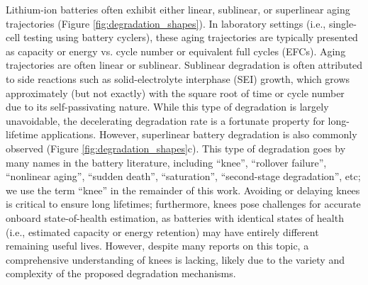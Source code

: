 \documentclass[journal=jpclcd,manuscript=article]{achemso}
\begin{document}
Lithium-ion batteries often exhibit either linear, sublinear, or superlinear aging trajectories (Figure \ref{fig:degradation_shapes}). In laboratory settings (i.e., single-cell testing using battery cyclers), these aging trajectories are typically presented as capacity or energy vs. cycle number or equivalent full cycles (EFCs). Aging trajectories are often linear\cite{ma_editors_2019, keil_electrochemical_2020, keil_electrochemical_2020,  preger_degradation_2020} or sublinear\cite{bloom_accelerated_2001, broussely_aging_2001, wright_calendar-_2002, smith_high_2011, attia_revisiting_2020}. Sublinear degradation is often attributed to side reactions such as solid-electrolyte interphase (SEI) growth, which grows approximately\cite{bloom_accelerated_2001, broussely_aging_2001, wright_calendar-_2002, smith_high_2011} (but not exactly\cite{attia_revisiting_2020}) with the square root of time or cycle number due to its self-passivating nature. While this type of degradation is largely unavoidable, the decelerating degradation rate is a fortunate property for long-lifetime applications. However, superlinear battery degradation is also commonly observed (Figure \ref{fig:degradation_shapes}c). This type of degradation goes by many names in the battery literature, including ``knee''\cite{diao_algorithm_2019, fermin-cueto_identification_2020}, ``rollover failure''\cite{ma_editors_2019}, ``nonlinear aging''\cite{schuster_nonlinear_2015, bach_nonlinear_2016, yang_modeling_2017, mandli_analysis_2019, keil_linear_2019, keil_electrochemical_2020, atalay_theory_2020}, ``sudden death''\cite{muller_model-based_2019, willenberg_development_2020}, ``saturation''\cite{lin_comprehensive_2013}, ``second-stage degradation''\cite{dubarry_perspective_2020}, etc; we use the term ``knee'' in the remainder of this work. Avoiding or delaying knees is critical to ensure long lifetimes; furthermore, knees pose challenges for accurate onboard state-of-health estimation, as batteries with identical states of health (i.e., estimated capacity or energy retention) may have entirely different remaining useful lives\cite{dubarry_perspective_2020}. However, despite many reports on this topic, a comprehensive understanding of knees is lacking, likely due to the variety and complexity of the proposed degradation mechanisms.
\end{document}
